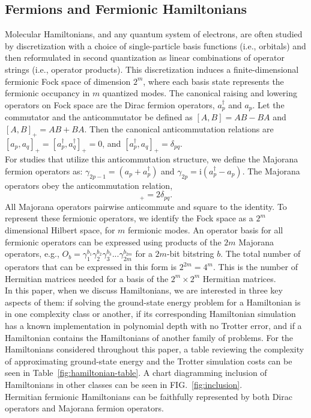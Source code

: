 \documentclass[%
 aip,
 amsmath,amssymb,
 reprint,%
]{revtex4-1}
\newcommand{\ac}[2]{[#1, #2]_+}    %
\newcommand{\comm}[2]{[#1, #2]}    %
\begin{document}
\subsection{Fermions and Fermionic Hamiltonians}
\label{sec:fermions-and-fermionic-hamiltonians}

\indent Molecular Hamiltonians, and any quantum system of electrons, are often studied by discretization with a choice of single-particle basis functions (i.e., orbitals) and then reformulated in second quantization as linear combinations of operator strings (i.e., operator products). This discretization induces a finite-dimensional fermionic %
Fock space of dimension $2^m$, where each basis state represents the fermionic occupancy in $m$ quantized modes. The canonical raising and lowering operators on Fock space are the  Dirac fermion operators, $a_p^{\dagger}$ and $a_p$. Let the commutator and the anticommutator be defined as  $\comm{A}{B} = AB-BA$ and  $\ac{A}{B} = AB+BA$. Then the canonical anticommutation relations are $\ac{a_p}{a_q} = \ac{a_p^{\dagger}}{a_q^{\dagger}} = 0$, and $\ac{a_p^{\dagger}}{a_q} = \delta_{pq}$. \\ 
\indent For studies that utilize this anticommutation structure, %
we define the Majorana fermion operators as: %
$\gamma_{{2p-1}} = (a_p+a_p^{\dagger})$ and $\gamma_{{2p}} = \mathrm{i}({a_p^{\dagger} - a_p})$. The Majorana operators obey the anticommutation relation, 
\begin{equation}
    \ac{\gamma_p}{\gamma_q} = 2\delta_{pq}.
    \label{eq:majorana-anticommutation}
\end{equation}
\indent All Majorana operators pairwise anticommute and square to the identity. To represent these fermionic operators, we identify the Fock space as a $2^m$ dimensional Hilbert space, for $m$ fermionic modes. %
An operator basis for all fermionic operators can be expressed using products of the $2m$ Majorana operators, e.g., $O_b = \gamma_1^{b_1} \gamma_2^{b_2}\gamma_3^{b_3} ... \gamma_{2m}^{{b_{2m}}}$ for a $2m$-bit bitstring $b$. The total number of operators that can be expressed in this form is $2^{2m} = 4^m$. This is the number of Hermitian matrices needed for a basis of the $2^m \times 2^m$ Hermitian matrices. \\
\indent In this paper, when we discuss Hamiltonians, we are interested in three key aspects of them: if solving the ground-state energy problem for a Hamiltonian is in one complexity class or another, if its corresponding Hamiltonian simulation has a known implementation in polynomial depth with no Trotter error, and if a Hamiltonian contains the Hamiltonians of another family of problems. For the Hamiltonians considered throughout this paper, a table reviewing the complexity of approximating ground-state energy and the Trotter simulation costs can be seen in Table~\ref{fig:hamiltonian-table}. A chart diagramming inclusion of Hamiltonians in other classes can be seen in FIG.~\ref{fig:inclusion}. \\
\indent Hermitian fermionic Hamiltonians can be faithfully represented by both Dirac  operators and Majorana fermion operators. 
\end{document}
